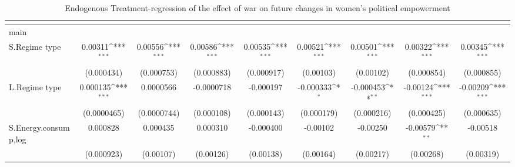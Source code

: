 \begin{table}[htbp]\centering
\def\sym#1{\ifmmode^{#1}\else\(^{#1}\)\fi}
\caption{Endogenous Treatment-regression of the effect of war on future changes in women's political empowerment\label{ivpolempowerment}}
\begin{tabular}{l*{8}{c}}
\hline\hline
                    &&&&&&&&\\
\hline
main                &                     &                     &                     &                     &                     &                     &                     &                     \\
S.Regime type       &     0.00311\sym{***}&     0.00556\sym{***}&     0.00586\sym{***}&     0.00535\sym{***}&     0.00521\sym{***}&     0.00501\sym{***}&     0.00322\sym{***}&     0.00345\sym{***}\\
                    &  (0.000434)         &  (0.000753)         &  (0.000883)         &  (0.000917)         &   (0.00103)         &   (0.00102)         &  (0.000854)         &  (0.000855)         \\
[1em]
L.Regime type       &    0.000135\sym{***}&   0.0000566         &  -0.0000718         &   -0.000197         &   -0.000333\sym{*}  &   -0.000453\sym{**} &    -0.00124\sym{***}&    -0.00209\sym{***}\\
                    & (0.0000465)         & (0.0000744)         &  (0.000108)         &  (0.000143)         &  (0.000179)         &  (0.000216)         &  (0.000425)         &  (0.000635)         \\
[1em]
S.Energy.consump,log&    0.000828         &    0.000435         &    0.000310         &   -0.000400         &    -0.00102         &    -0.00250         &    -0.00579\sym{**} &    -0.00518         \\
                    &  (0.000923)         &   (0.00107)         &   (0.00126)         &   (0.00138)         &   (0.00164)         &   (0.00217)         &   (0.00268)         &   (0.00319)         \\

\end{tabular}
\end{table}

